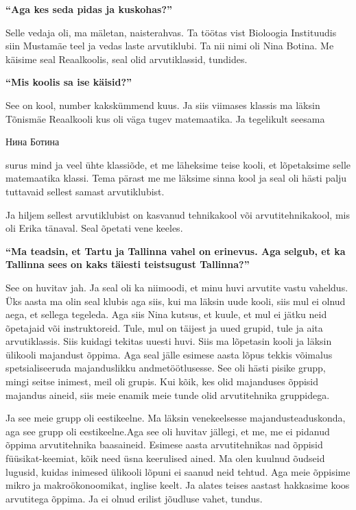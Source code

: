 \textbf{\enquote{Aga kes seda pidas ja kuskohas?}}

Selle vedaja oli, ma mäletan, naisterahvas. Ta töötas vist Bioloogia Instituudis siin Mustamäe teel ja vedas laste  arvutiklubi. Ta nii nimi oli Nina Botina. Me käisime seal Reaalkoolis, seal olid arvutiklassid, tundides.

\textbf{\enquote{Mis koolis sa ise käisid?}}

See on kool, number kakskümmend kuus. Ja siis viimases klassis ma läksin Tõnismäe Reaalkooli kus oli väga tugev matemaatika. Ja tegelikult seesama \begin{russian}Нина Ботина\end{russian}  surus mind ja veel ühte klassiõde, et me läheksime teise kooli, et lõpetaksime selle matemaatika klassi. Tema pärast me me läksime sinna kool ja seal oli hästi palju  tuttavaid sellest samast arvutiklubist.

Ja hiljem sellest arvutiklubist on kasvanud tehnikakool või arvutitehnikakool, mis oli Erika tänaval. Seal õpetati vene keeles. 

\textbf{\enquote{Ma teadsin, et Tartu ja Tallinna vahel on erinevus. Aga selgub, et ka Tallinna sees on kaks täiesti teistsugust Tallinna?}}

See on huvitav jah. Ja seal oli ka niimoodi, et minu huvi  arvutite vastu vaheldus. Üks aasta ma olin seal klubis aga siis, kui ma läksin uude kooli, siis mul ei olnud aega, et  sellega tegeleda. Aga siis Nina kutsus, et kuule, et mul ei jätku neid õpetajaid või instruktoreid. Tule, mul on täijest ja uued grupid, tule ja aita arvutiklassis. Siis kuidagi  tekitas uuesti huvi. Siis ma lõpetasin kooli ja läksin ülikooli majandust õppima. Aga seal jälle  esimese aasta lõpus tekkis võimalus spetsialiseeruda majanduslikku andmetöötlusesse. See oli hästi pisike grupp, mingi seitse inimest, meil oli grupis. Kui kõik, kes olid majanduses õppisid majandus aineid, siis meie enamik meie tunde olid  arvutitehnika gruppidega.

Ja see meie grupp oli eestikeelne. Ma läksin venekeelsesse majandusteaduskonda, aga see grupp oli eestikeelne.Aga
see oli huvitav jällegi, et me, me ei pidanud õppima arvutitehnika baasaineid. Esimese aasta arvutitehnikas nad õppisid füüsikat-keemiat, kõik need üsna keerulised ained. Ma olen kuulnud õudseid lugusid, kuidas inimesed ülikooli lõpuni ei saanud neid tehtud. Aga meie õppisime mikro ja makroökonoomikat, inglise keelt. Ja alates teises aastast hakkasime koos arvutitega õppima. Ja ei olnud erilist jõudluse vahet, tundus.

